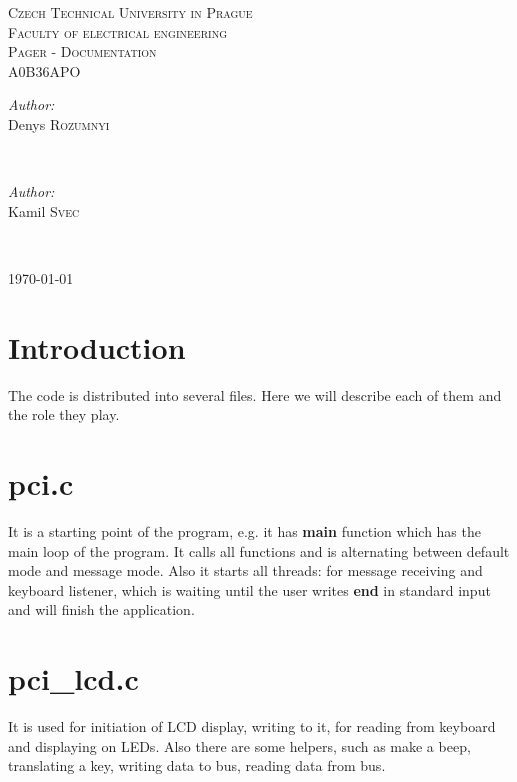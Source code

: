 \documentclass[12pt]{article}
\begin{document}
\begin{center}
\textsc{\LARGE Czech Technical University in Prague}\\[0.5cm]
\textsc{\Large Faculty of electrical engineering}\\[0.5cm]
\textsc{\Large Pager - Documentation}\\[0.5cm]
\textsc{\large A0B36APO}\\[0.5cm]

\begin{minipage}{0.4\textwidth}
\begin{flushleft} \large
\emph{Author:}\\
Denys \textsc{Rozumnyi} 
\end{flushleft}
\end{minipage}
~
\begin{minipage}{0.4\textwidth}
\begin{flushright} \large
\emph{Author:} \\
Kamil \textsc{Svec}
\end{flushright}
\end{minipage}\\[0.5cm]


\begin{center}
{\large \today}
\end{center}

\end{center}

\section{Introduction}
The code is distributed into several files. Here we will describe each of them and the role they play.

\section{pci.c}
It is a starting point of the program, e.g. it has \textbf{main} function which has the main loop of the program. It calls all functions and is alternating between default mode and message mode. Also it starts all threads: for message receiving and keyboard listener, which is waiting until the user writes \textbf{end} in standard input and will finish the application. 

\section{pci\_lcd.c}
It is used for initiation of LCD display, writing to it, for reading from keyboard and displaying on LEDs. Also there are some helpers, such as make a beep, translating a key, writing data to bus, reading data from bus.
\end{document}
